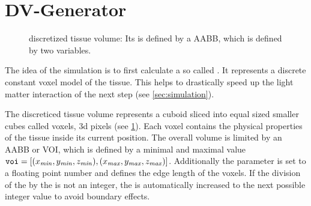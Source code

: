 \section{DV-Generator}
\label{sec:dv_generator}
%
\begin{figure}[!t]
\centering
\setlength{\tikzwidth}{0.5\textwidth}
\caption[discreticed tissue volume]{discretized tissue volume: Its \dummy{} is defined by a \ac{AABB}, which is defined by two variables. }
\label{fig:discVol}
\end{figure}
%
%
The idea of the simulation is to first calculate a so called .
It represents a discrete constant voxel model of the tissue.
This helps to drastically speed up the light matter interaction of the next step (see \cref{sec:simulation}).
\par
%
The discreticed tissue volume represents a cuboid sliced into equal sized smaller cubes called voxels, \ie 3d pixels (see \cref{fig:discVol}).
Each voxel contains the physical properties of the tissue inside its current position.
The overall volume is limited by an \ac{AABB} or \ac{VOI}, which is defined by a minimal and maximal value $\texttt{voi} = [(x_{\mathit{min}}, y_{\mathit{min}}, z_{\mathit{min}}),(x_{\mathit{max}}, y_{\mathit{max}}, z_{\mathit{max}})]$.
Additionally the \voxelsize{} parameter \voxels{} is set to a floating point number and defines the edge length of the voxels.
If the division of the \voi{} by the \voxelsize{} is not an integer, the \voi{} is automatically increased to the next possible integer value to avoid boundary effects.
%
%
%
